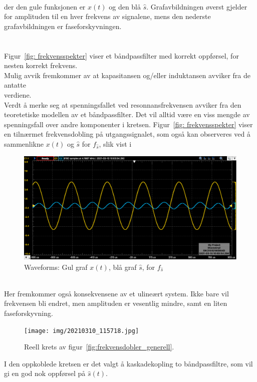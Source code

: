 \documentclass[a4paper,11pt,norsk]{article}
\begin{document}
\\
der den gule funksjonen er $x(t)$ og den blå $\hat{s}$. Grafavbildningen øverst gjelder for amplituden til en hver frekvens av signalene, mens den nederste grafavbildningen er faseforskyvningen.  \\\\\\
Figur~\ref{fig: frekvensspekter} viser et båndpassfilter med korrekt oppførsel, for nesten korrekt frekvens. \\
Mulig avvik fremkommer av at kapasitansen og/eller induktansen avviker fra de antatte \\verdiene. \\
Verdt å merke seg at spenningsfallet ved resonnansfrekvensen avviker fra den teoretetiske modellen av et båndpassfilter. Det vil alltid være en viss mengde av spenningsfall over andre komponenter i kretsen.
\newpage
Figur~\ref{fig: frekvensspekter} viser en tilnærmet frekvensdobling på utgangssignalet, som også kan observeres ved å sammenlikne $x(t)$ og $\hat{s}$ for $f_{\hat{s}}$, slik vist i
\begin{figure}[htbp]
\centering
\includegraphics[width=1.0\textwidth]{img/Scope_Waveforms_img.png}
\caption{Waveforms: Gul graf $x(t)$, blå graf $\hat{s}$, for $f_{\hat{s}}$}
\label{fig: realKrets}
\end{figure}
\\
Her fremkommer også konsekvensene av et ulineært system. Ikke bare vil frekvensen bli endret, men amplituden er vesentlig mindre, samt en liten faseforskyvning.
\newpage
\begin{figure}[htbp]
\centering
\texttt{[image: img/20210310\_115718.jpg]}
\caption{Reell krets av figur~\ref{fig:frekvensdobler_generell}.}
\label{fig: realKrets}
\end{figure}
I den oppkoblede kretsen er det valgt å kaskadekopling to båndpassfiltre, som vil gi en god nok oppførsel på $\hat{s}(t)$.
\end{document}

